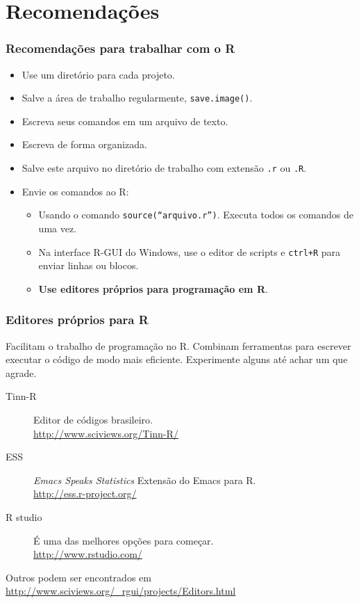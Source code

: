\documentclass{beamer}
\begin{document}
\section{Recomendações}
\begin{frame}
  \frametitle{Recomendações para trabalhar com o R}
  \begin{itemize}
    \item Use um diretório para cada projeto.
      \item Salve a área de trabalho regularmente, \texttt{save.image()}.
      \item Escreva seus comandos em um arquivo de texto.
      \item Escreva de forma organizada.
      \item Salve este arquivo no diretório de trabalho com extensão \texttt{.r} ou \texttt{.R}.
      \item Envie os comandos ao R:
        \begin{itemize}
         \item Usando o comando \texttt{source(``arquivo.r'')}. Executa todos os comandos de uma vez.
         \item Na interface R-GUI do Windows, use o editor de scripts e \texttt{ctrl+R} para enviar linhas ou blocos.
         \item \textbf{ Use editores próprios para programação em R}.
        \end{itemize}
  \end{itemize}
\end{frame}
\begin{frame}
  \frametitle{Editores próprios para R}
  
     Facilitam o trabalho de programação no R. Combinam ferramentas para escrever executar o código de modo mais eficiente. Experimente alguns até achar um que agrade.

     \begin{description}
     \item[Tinn-R] Editor de códigos brasileiro.\\
       \url{http://www.sciviews.org/Tinn-R/}\\
           \item[ESS] \textit{Emacs Speaks Statistics}  Extensão do Emacs para R.\\
             \url{http://ess.r-project.org/}\\
           \item[R studio] É uma das melhores opções para começar. \\
                 \url {http://www.rstudio.com/} 
     \end{description}
     Outros podem ser encontrados em \url{http://www.sciviews.org/_rgui/projects/Editors.html}
\end{frame}
\end{document}
